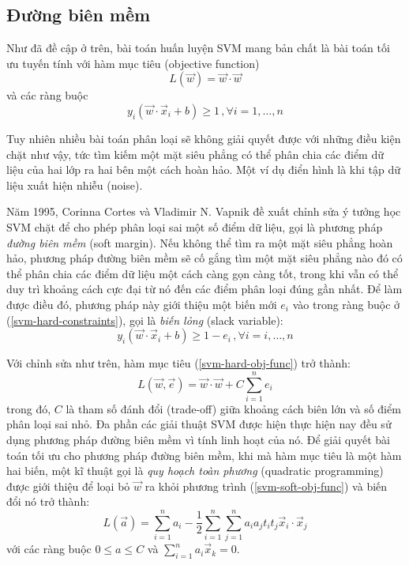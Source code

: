 \subsection*{Đường biên mềm}
Như đã đề cập ở trên, bài toán huấn luyện SVM mang bản chất là bài toán tối ưu tuyến tính với hàm mục tiêu (objective function)
\begin{equation}\label{svm-hard-obj-func}
L(\vec{w})=\vec{w}\cdot\vec{w}
\end{equation}
và các ràng buộc
\begin{equation}\label{svm-hard-constraints}
y_i(\vec{w}\cdot\vec{x}_i+b)\geq1\,,\forall i=1,\dots,n
\end{equation}

Tuy nhiên nhiều bài toán phân loại sẽ không giải quyết được với những điều kiện chặt như vậy, tức tìm kiếm một mặt siêu phẳng có thể phân chia các điểm dữ liệu của hai lớp ra hai bên một cách hoàn hảo. Một ví dụ điển hình là khi tập dữ liệu xuất hiện nhiễu (noise).

Năm 1995, Corinna Cortes và Vladimir N. Vapnik đề xuất chỉnh sửa ý tưởng học SVM chặt để cho phép phân loại sai một số điểm dữ liệu, gọi là phương pháp \emph{đường biên mềm} (soft margin). Nếu không thể tìm ra một mặt siêu phẳng hoàn hảo, phương pháp đường biên mềm sẽ cố gắng tìm một mặt siêu phẳng nào đó có thể phân chia các điểm dữ liệu một cách càng gọn càng tốt, trong khi vẫn có thể duy trì khoảng cách cực đại từ nó đến các điểm phân loại đúng gần nhất. Để làm được điều đó, phương pháp này giới thiệu một biến mới $e_i$ vào trong ràng buộc ở (\ref{svm-hard-constraints}), gọi là \emph{biến lỏng} (slack variable):
\begin{equation}
y_i(\vec{w}\cdot\vec{x}_i+b)\geq1-e_i\,,\forall i=i,\dots,n
\end{equation}

Với chỉnh sửa như trên, hàm mục tiêu (\ref{svm-hard-obj-func}) trở thành:
\begin{equation}\label{svm-soft-obj-func}
L(\vec{w},\vec{e})=\vec{w}\cdot\vec{w}+C\sum_{i=1}^{n}e_i
\end{equation}
trong đó, $C$ là tham số đánh đổi (trade-off) giữa khoảng cách biên lớn và số điểm phân loại sai nhỏ. Đa phần các giải thuật SVM được hiện thực hiện nay đều sử dụng phương pháp đường biên mềm vì tính linh hoạt của nó. Để giải quyết bài toán tối ưu cho phương pháp đường biên mềm, khi mà hàm mục tiêu là một hàm hai biến, một kĩ thuật gọi là \emph{quy hoạch toàn phương} (quadratic programming) được giới thiệu để loại bỏ $\vec{w}$ ra khỏi phương trình (\ref{svm-soft-obj-func}) và biến đổi nó trở thành:
\begin{equation}\label{svm-soft-obj-func-modified}
L(\vec{a})=\sum_{i=1}^{n}a_i-\frac{1}{2}\sum_{i=1}^{n}\sum_{j=1}^{n}a_ia_jt_it_j\vec{x}_i\cdot\vec{x}_j
\end{equation}
với các ràng buộc $0\leq a\leq C$ và $\sum_{i=1}^{n}a_i\vec{x}_k=0$.

